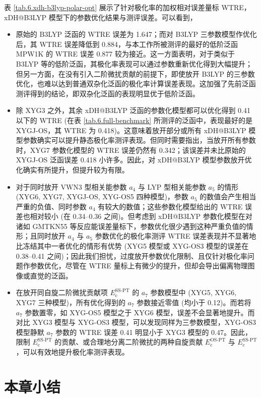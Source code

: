 表 \ref{tab.6.xdh-b3lyp-polar-opt} 展示了针对极化率的加权相对误差量标 WTRE，xDH@B3LYP 模型下的参数优化结果与测评误差。可以看到，
\begin{itemize}[nosep]
    \item 原始的 B3LYP 泛函的 WTRE 误差为 1.647；而对 B3LYP 三参数模型作优化后，其 WTRE 误差降低到 0.884，与本工作所被测评的最好的低阶泛函 MPW1K 的 WTRE 误差 0.877 较为接近。这一方面表明，对于类似于 B3LYP 等的低阶泛函，其极化率表现可以通过参数重新优化得到大幅提升；但另一方面，在没有引入二阶微扰贡献的前提下，即使放开 B3LYP 的三参数优化，也难以达到普通双杂化泛函的极化率计算误差表现。这加强了先前泛函测评得到的结论，即双杂化泛函的表现明显优于低阶泛函。
    \item 除 XYG3 之外，其余 xDH@B3LYP 泛函的参数化模型都可以优化得到 0.41 以下的 WTRE (在表 \ref{tab.6.full-benchmark} 所测评的泛函中，表现最好的是 XYGJ-OS，其 WTRE 为 0.418)。这意味着放开部分或所有 xDH@B3LYP 模型参数确实可以提升静态极化率测评表现。但同时需要指出，当放开所有参数时，XYG7 参数化模型的 WTRE 误差仍然有 0.342；该误差并未比原始的 XYGJ-OS 泛函误差 0.418 小许多。因此，对 xDH@B3LYP 模型参数放开优化确实有所提升，但提升较为有限。
    \item 对于同时放开 VWN3 型相关能参数 $a_4$ 与 LYP 型相关能参数 $a_5$ 的情形 (XYG6, XYG7, XYGJ-OS, XYG-OS5 四种模型)，参数 $a_5$ 的数值会产生相当严重的负值、同时参数 $a_4$ 有较大的数值；这些参数化模型给出的 WTRE 误差也相对较小 (在 0.34--0.36 之间)。但考虑到 xDH@B3LYP 参数化模型在对诸如 GMTKN55 等反应能误差量标下，参数优化很少遇到这种严重负值的情形；且同时放开 $a_4$ 与 $a_5$ 参数优化的极化率测评 WTRE 误差表现并不显著地比冻结其中一者优化的情形有优势 (XYG5 模型或 XYG-OS3 模型的误差在 0.38--0.41 之间)；因此我们担忧，过度放开参数优化限制、且仅针对极化率问题作参数优化，尽管在 WTRE 量标上有微少的提升，但却会导出偏离物理图像或直觉的泛函。
    \item 在放开同自旋二阶微扰贡献项 $E_\mathrm{c}^\text{SS-PT}$ 的 $a_7$ 参数模型中 (XYG5, XYG6, XYG7 三种模型)，所有优化得到的 $a_7$ 参数接近零值 (均小于 0.12)。而若将 $a_7$ 参数置零，如 XYG-OS5 模型之于 XYG6 模型，误差不会显著地提升。而对比 XYG3 模型与 XYG-OS3 模型，可以发现同样为三参数模型，XYG-OS3 模型静默 $a_7$ 参数的 WTRE 误差 0.41 明显小于 XYG3 模型的 0.47。因此，限制 $E_\mathrm{c}^\text{SS-PT}$ 的贡献、或合理地分离二阶微扰的两种自旋贡献 $E_\mathrm{c}^\text{OS-PT}$ 与 $E_\mathrm{c}^\text{SS-PT}$，可以有效地提升极化率测评表现。
\end{itemize}

\section{本章小结}

